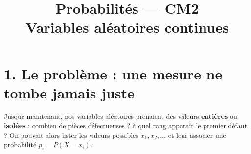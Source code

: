 
\usepackage{tikz}

\newcommand{\atrou}[2][3cm]{%
  \ifthenelse{\boolean{showSolutions}}{%
    \par\vspace{0.5em}%
    \begin{mdframed}[backgroundcolor=ThemeLight, linewidth=0pt,
      skipabove=0pt, skipbelow=0pt,
      innertopmargin=8pt, innerbottommargin=8pt]%
    #2%
    \end{mdframed}%
    \par\vspace{0.5em}%
  }{%
    \par\vspace{0.5em}%
    \noindent\fbox{\begin{minipage}[c][#1]%
      {\dimexpr\textwidth-2\fboxsep-2\fboxrule\relax}%
      \color{white}\rule{0pt}{0pt}%
    \end{minipage}}%
    \par\vspace{0.5em}%
  }%
}

\newcommand{\val}[1]{%
  \ifthenelse{\boolean{showSolutions}}{#1}{\phantom{#1}}%
}

\newcommand{\R}{\mathbb{R}}

\title{\sffamily\bfseries Probabilités --- CM2\\[0.3em]
  \Large Variables aléatoires continues}
\author{}
\date{}


\sffamily
\maketitle
\thispagestyle{empty}

\section*{1. Le problème : une mesure ne tombe jamais juste}

Jusque maintenant, nos variables aléatoires prenaient des valeurs
\textbf{entières} ou \textbf{isolées} : \newline 
\og combien de pièces
défectueuses ? \fg{} 
\og à quel rang apparaît le premier défaut ? \fg{}\newline
On pouvait alors lister les valeurs possibles $x_1,x_2,\dots$
et leur associer une probabilité $p_i=P(X=x_i)$.


